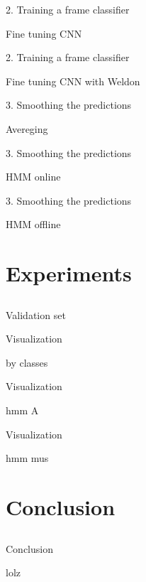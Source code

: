 \begin{frame}{2. Training a frame classifier}

	Fine tuning CNN
	

\end{frame}

\begin{frame}{2. Training a frame classifier}

	Fine tuning CNN with Weldon
	

\end{frame}

\begin{frame}{3. Smoothing the predictions}

	Avereging
	

\end{frame}

\begin{frame}{3. Smoothing the predictions}

	HMM online
	

\end{frame}

\begin{frame}{3. Smoothing the predictions}

	HMM offline
	

\end{frame}
	
	
\section{Experiments} \subsection{}\label{}

\begin{frame}{Validation set}
	

\end{frame}

\begin{frame}{Visualization}

	by classes	
	
\end{frame}

\begin{frame}{Visualization}

	hmm A
	
\end{frame}

\begin{frame}{Visualization}

	hmm mus
	
\end{frame}


\section{Conclusion} \subsection{}\label{}

\begin{frame}{Conclusion}

	lolz
	
\end{frame}